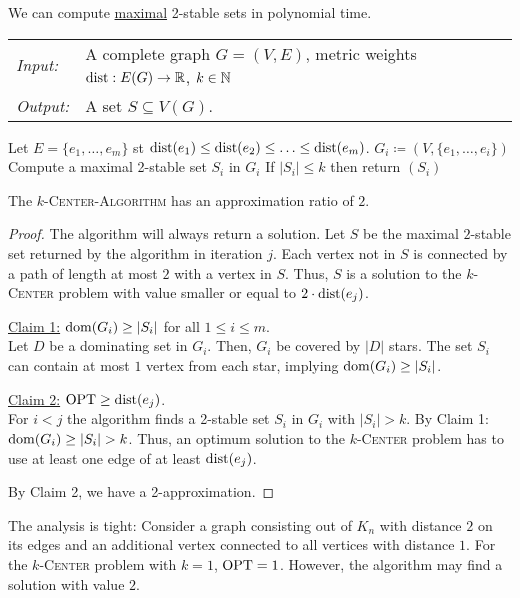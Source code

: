 \documentclass[../skript.tex]{subfiles}
\begin{document}
We can compute \underline{maximal} 2-stable sets in polynomial time.
\begin{algorithm}
\begin{tabular}{ll}
\textit{Input:} & A complete graph $G = (V, E)$, metric weights $\operatorname*{dist} : E(G) \to \mathbb{R}$, $k \in \mathbb{N}$ \\
\textit{Output:} & A set $S \subseteq V(G)$.
\end{tabular}
\begin{algorithmic}[1]
\State Let $E = \{ e_1, \ldots, e_m \}$ \ac{st} $\operatorname*{dist}(e_1) \leq \operatorname*{dist}(e_2) \leq \ldots \leq \operatorname*{dist}(e_m)$.
\State $G_i \coloneqq (V, \{ e_1, \ldots, e_i \})$
\State Compute a maximal 2-stable set $S_i$ in $G_i$
\State If $|S_i| \leq k$ then return $(S_i)$
\EndFor
\end{algorithmic}
\end{algorithm}
\begin{theorem} %
\label{thm:25}
The \textsc{$k$-Center-Algorithm} has an approximation ratio of $2$.
\end{theorem}
\begin{proof}
The algorithm will always return a solution.
Let $S$ be the maximal $2$-stable set returned by the algorithm in iteration $j$.
Each vertex not in $S$ is connected by a path of length at most $2$ with a vertex in $S$.
Thus, $S$ is a solution to the \textsc{$k$-Center} problem with value smaller or equal to $2 \cdot \operatorname*{dist}(e_j)$.

\underline{Claim 1:} $\operatorname{dom}(G_i) \geq |S_i|$ for all $1 \leq i \leq m$. \\
Let $D$ be a dominating set in $G_i$. Then, $G_i$ be covered by $|D|$ stars. The set $S_i$ can contain at most $1$ vertex from each star, implying $\operatorname{dom}(G_i) \geq |S_i|$.

\underline{Claim 2:} $\operatorname{OPT} \geq \operatorname*{dist}(e_j)$. \\
For $i < j$ the algorithm finds a 2-stable set $S_i$ in $G_i$ with $|S_i| > k$. By Claim 1: $\operatorname{dom}(G_i) \geq |S_i| > k$.
Thus, an optimum solution to the \textsc{$k$-Center} problem has to use at least one edge of at least $\operatorname*{dist}(e_j)$.

By Claim 2, we have a 2-approximation.
\end{proof} 
\begin{remark}
The analysis is tight:
Consider a graph consisting out of $K_n$ with distance $2$ on its edges and an additional vertex connected to all vertices with distance $1$. For the \textsc{$k$-Center} problem with $k = 1$, $\operatorname{OPT} = 1$. However, the algorithm may find a solution with value $2$.
\end{remark}
\end{document}
